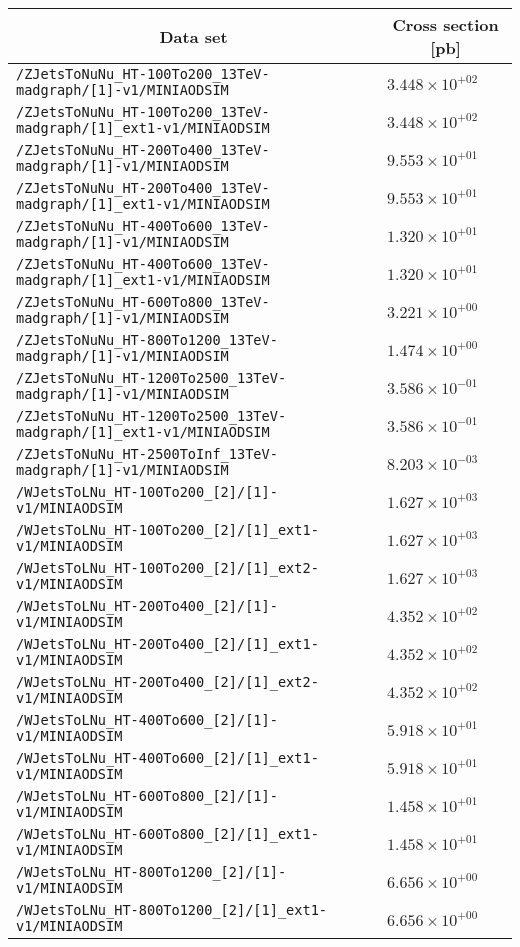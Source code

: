 \begin{center}
\begin{tabular}{ll}
\hline\hline
\multicolumn{1}{c}{Data set}&\multicolumn{1}{c}{Cross section [pb]}\tabularnewline
\hline
\verb!/ZJetsToNuNu_HT-100To200_13TeV-madgraph/[1]-v1/MINIAODSIM! &$3.448\times 10^{+02}$\tabularnewline
\verb!/ZJetsToNuNu_HT-100To200_13TeV-madgraph/[1]_ext1-v1/MINIAODSIM! &$3.448\times 10^{+02}$\tabularnewline
\verb!/ZJetsToNuNu_HT-200To400_13TeV-madgraph/[1]-v1/MINIAODSIM! &$9.553\times 10^{+01}$\tabularnewline
\verb!/ZJetsToNuNu_HT-200To400_13TeV-madgraph/[1]_ext1-v1/MINIAODSIM! &$9.553\times 10^{+01}$\tabularnewline
\verb!/ZJetsToNuNu_HT-400To600_13TeV-madgraph/[1]-v1/MINIAODSIM! &$1.320\times 10^{+01}$\tabularnewline
\verb!/ZJetsToNuNu_HT-400To600_13TeV-madgraph/[1]_ext1-v1/MINIAODSIM! &$1.320\times 10^{+01}$\tabularnewline
\verb!/ZJetsToNuNu_HT-600To800_13TeV-madgraph/[1]-v1/MINIAODSIM! &$3.221\times 10^{+00}$\tabularnewline
\verb!/ZJetsToNuNu_HT-800To1200_13TeV-madgraph/[1]-v1/MINIAODSIM! &$1.474\times 10^{+00}$\tabularnewline
\verb!/ZJetsToNuNu_HT-1200To2500_13TeV-madgraph/[1]-v1/MINIAODSIM! &$3.586\times 10^{-01}$\tabularnewline
\verb!/ZJetsToNuNu_HT-1200To2500_13TeV-madgraph/[1]_ext1-v1/MINIAODSIM! &$3.586\times 10^{-01}$\tabularnewline
\verb!/ZJetsToNuNu_HT-2500ToInf_13TeV-madgraph/[1]-v1/MINIAODSIM! &$8.203\times 10^{-03}$\tabularnewline
\verb!/WJetsToLNu_HT-100To200_[2]/[1]-v1/MINIAODSIM! &$1.627\times 10^{+03}$\tabularnewline
\verb!/WJetsToLNu_HT-100To200_[2]/[1]_ext1-v1/MINIAODSIM! &$1.627\times 10^{+03}$\tabularnewline
\verb!/WJetsToLNu_HT-100To200_[2]/[1]_ext2-v1/MINIAODSIM! &$1.627\times 10^{+03}$\tabularnewline
\verb!/WJetsToLNu_HT-200To400_[2]/[1]-v1/MINIAODSIM! &$4.352\times 10^{+02}$\tabularnewline
\verb!/WJetsToLNu_HT-200To400_[2]/[1]_ext1-v1/MINIAODSIM! &$4.352\times 10^{+02}$\tabularnewline
\verb!/WJetsToLNu_HT-200To400_[2]/[1]_ext2-v1/MINIAODSIM! &$4.352\times 10^{+02}$\tabularnewline
\verb!/WJetsToLNu_HT-400To600_[2]/[1]-v1/MINIAODSIM! &$5.918\times 10^{+01}$\tabularnewline
\verb!/WJetsToLNu_HT-400To600_[2]/[1]_ext1-v1/MINIAODSIM! &$5.918\times 10^{+01}$\tabularnewline
\verb!/WJetsToLNu_HT-600To800_[2]/[1]-v1/MINIAODSIM! &$1.458\times 10^{+01}$\tabularnewline
\verb!/WJetsToLNu_HT-600To800_[2]/[1]_ext1-v1/MINIAODSIM! &$1.458\times 10^{+01}$\tabularnewline
\verb!/WJetsToLNu_HT-800To1200_[2]/[1]-v1/MINIAODSIM! &$6.656\times 10^{+00}$\tabularnewline
\verb!/WJetsToLNu_HT-800To1200_[2]/[1]_ext1-v1/MINIAODSIM! &$6.656\times 10^{+00}$\tabularnewline

\end{tabular}
\end{center}
